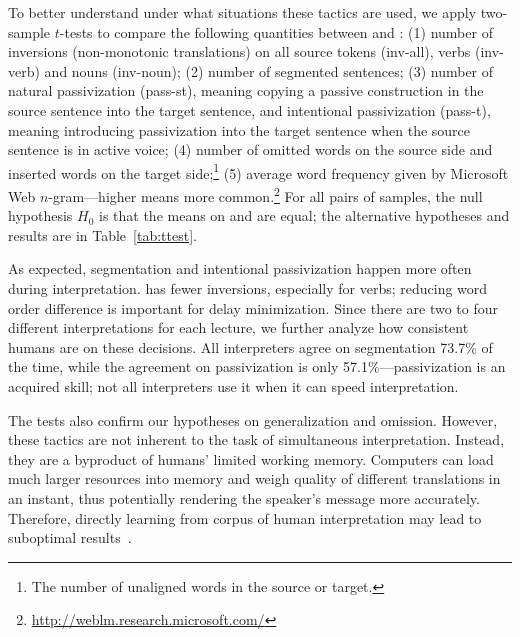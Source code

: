 To better understand under what situations these tactics are used, we
apply two-sample $t$-tests to compare the following quantities between
\inter{} and \trans{}: (1) number of inversions (non-monotonic
translations) on all source tokens ({inv-all}), verbs ({inv-verb}) and
nouns ({inv-noun}); (2) number of segmented sentences; (3) number of
natural passivization ({pass-st}), meaning copying a passive
construction in the source sentence into the target sentence, and
intentional passivization ({pass-t}), meaning introducing
passivization into the target sentence when the source sentence is in
active voice; (4) number of omitted words on the source side and
inserted words on the target side;\footnote{The number
  of unaligned words in the source or target.}
(5) average word frequency given by Microsoft Web $n$-gram---higher
means more
common.\footnote{\url{http://weblm.research.microsoft.com/}} For all
pairs of samples, the null hypothesis $H_0$ is that the means on
\inter{} and \trans{} are equal; the alternative hypotheses and
results are in Table~\ref{tab:ttest}.

As expected, segmentation and intentional passivization happen more
often during interpretation.  \inter{} has fewer inversions, especially
for verbs; reducing word order difference is
important for delay minimization.  Since there are two to four
different interpretations for each lecture, we further analyze how
consistent humans are on these decisions.  All interpreters agree on
segmentation 73.7\% of the time, while the agreement on passivization
is only 57.1\%---passivization is an acquired skill; not all
interpreters use it when it can speed interpretation.

The tests also confirm our hypotheses on generalization and omission.
However, these tactics are not inherent to the task of simultaneous
interpretation.  Instead, they are a byproduct of humans' limited
working memory.  Computers can load much larger resources into memory
and weigh quality of different translations in an instant, thus
potentially rendering the speaker's message more accurately.
Therefore, directly learning from corpus of human interpretation may
lead to suboptimal results~\cite{shimizu14corpus}.
